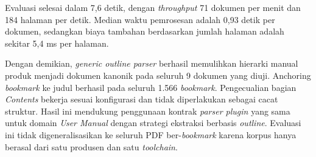 Evaluasi selesai dalam 7,6 detik, dengan \textit{throughput} 71 dokumen per menit dan 184 halaman per detik.
Median waktu pemrosesan adalah 0,93 detik per dokumen, sedangkan biaya tambahan berdasarkan jumlah halaman adalah sekitar 5,4 ms per halaman.

Dengan demikian, \textit{generic outline parser} berhasil memulihkan hierarki manual produk menjadi dokumen kanonik pada seluruh 9 dokumen yang diuji.
Anchoring \textit{bookmark} ke judul berhasil pada seluruh 1.566 \textit{bookmark}.
Pengecualian bagian \textit{Contents} bekerja sesuai konfigurasi dan tidak diperlakukan sebagai cacat struktur.
Hasil ini mendukung penggunaan kontrak \textit{parser plugin} yang sama untuk domain \textit{User Manual} dengan strategi ekstraksi berbasis \textit{outline}.
Evaluasi ini tidak digeneralisasikan ke seluruh PDF ber-\textit{bookmark} karena korpus hanya berasal dari satu produsen dan satu \textit{toolchain}.
